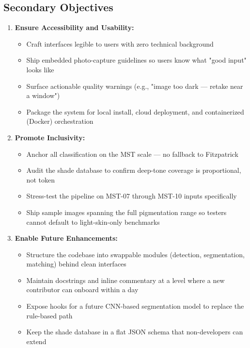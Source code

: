\subsection{Secondary Objectives}

\begin{enumerate}
    \item \textbf{Ensure Accessibility and Usability:}
    \begin{itemize}
        \item Craft interfaces legible to users with zero technical background
        \item Ship embedded photo-capture guidelines so users know what "good input" looks like
        \item Surface actionable quality warnings (e.g., "image too dark — retake near a window")
        \item Package the system for local install, cloud deployment, and containerized (Docker) orchestration
    \end{itemize}
    
    \item \textbf{Promote Inclusivity:}
    \begin{itemize}
        \item Anchor all classification on the MST scale — no fallback to Fitzpatrick
        \item Audit the shade database to confirm deep-tone coverage is proportional, not token
        \item Stress-test the pipeline on MST-07 through MST-10 inputs specifically
        \item Ship sample images spanning the full pigmentation range so testers cannot default to light-skin-only benchmarks
    \end{itemize}
    
    \item \textbf{Enable Future Enhancements:}
    \begin{itemize}
        \item Structure the codebase into swappable modules (detection, segmentation, matching) behind clean interfaces
        \item Maintain docstrings and inline commentary at a level where a new contributor can onboard within a day
        \item Expose hooks for a future CNN-based segmentation model to replace the rule-based path
        \item Keep the shade database in a flat JSON schema that non-developers can extend
    \end{itemize}
    

\end{enumerate}

